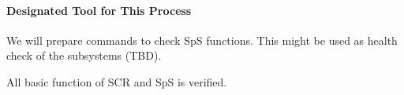 \paragraph{Designated Tool for This Process}
We will prepare commands to check SpS functions.
This might be used as health check of the subsystems (TBD).


\begin{itembox}[l]{}
All basic function of SCR and SpS is verified.
\end{itembox}